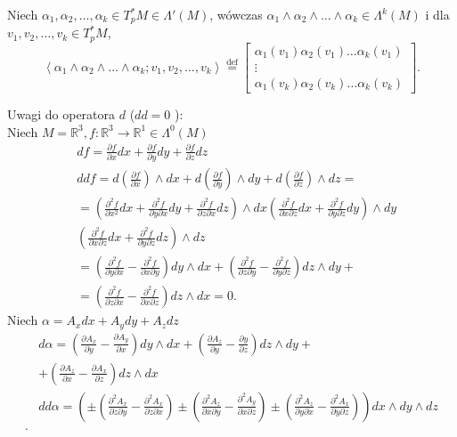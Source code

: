 \documentclass[../main.tex]{subfiles}
\begin{document}
\begin{definicja}
    Niech $\alpha_1,\alpha_2,\ldots,\alpha_k\in T_p^*M\in\Lambda'(M)$, wówczas $\alpha_1\land\alpha_2\land\ldots\land\alpha_k\in \Lambda^k(M)$ i dla $v_1,v_2,\ldots,v_k\in T_p^*M$,
    \[
        \left<\alpha_1\land\alpha_2\land\ldots\land\alpha_k; v_1,v_2,\ldots,v_k \right> \overset{\text{def}}{=}  \begin{bmatrix} \alpha_1(v_1)\alpha_2(v_1)\ldots\alpha_k(v_1)\\ \vdots \\ \alpha_1(v_k)\alpha_2(v_k)\ldots\alpha_k(v_k) \end{bmatrix}
    .\]
\end{definicja}
Uwagi do operatora $d$ ($dd=0$ ):\\
Niech $M = \mathbb{R}^3, f:\mathbb{R}^3\to\mathbb{R}^1\in\Lambda^0(M)$
\begin{align*}
&df = \frac{\partial f}{\partial x} dx+ \frac{\partial f}{\partial y} dy + \frac{\partial f}{\partial z} dz\\
&ddf = d\left( \frac{\partial f}{\partial x}  \right) \land dx + d\left( \frac{\partial f}{\partial y}  \right) \land dy + d\left( \frac{\partial f}{\partial z}  \right) \land dz = \\
&= \left( \frac{\partial^2 f}{\partial x^2} dx + \frac{\partial ^2 f}{\partial y \partial x} dy + \frac{\partial ^2 f}{\partial z \partial x} dz \right) \land dx \left( \frac{\partial ^2 f}{\partial x \partial z} dx + \frac{\partial ^2 f}{\partial y \partial z} dy \right) \land dy \\
&\left( \frac{\partial ^2 f}{\partial x \partial z} dx + \frac{\partial ^2 f}{\partial y \partial z} dz \right) \land dz \\
&= \left( \frac{\partial ^2 f}{\partial y\partial x} - \frac{\partial ^2f}{\partial x\partial y}  \right) dy\land dx + \left( \frac{\partial ^2f}{\partial z\partial y} - \frac{\partial ^2f}{\partial y\partial z}  \right) dz\land dy +\\
&= \left( \frac{\partial ^2f}{\partial z\partial x} -\frac{\partial ^2f}{\partial x\partial z}  \right)dz\land dx = 0
.\end{align*}
Niech $\alpha = A_x dx + A_ydy + A_zdz$ \\
 \begin{align*}
     &d\alpha = \left( \frac{\partial A_x}{\partial y} - \frac{\partial A_y}{\partial x}  \right) dy\land dx + \left( \frac{\partial A_z}{\partial y} - \frac{\partial y}{\partial z}  \right) dz\land dy +\\
     &+ \left( \frac{\partial A_z}{\partial x} - \frac{\partial A_x}{\partial z}  \right)dz\land dx  \\
     &dd\alpha = \left( \pm \left( \frac{\partial ^2A_x}{\partial z\partial y} - \frac{\partial ^2A_x}{\partial z \partial x}  \right) \pm \left( \frac{\partial ^2A_z}{\partial x\partial y}  - \frac{\partial ^2A_y}{\partial x\partial z}\right) \pm \left( \frac{\partial ^2A_z}{\partial y\partial x}  - \frac{\partial ^2A_x}{\partial y\partial z} \right)  \right)dx\land dy\land dz  \\
.\end{align*}
\end{document}
